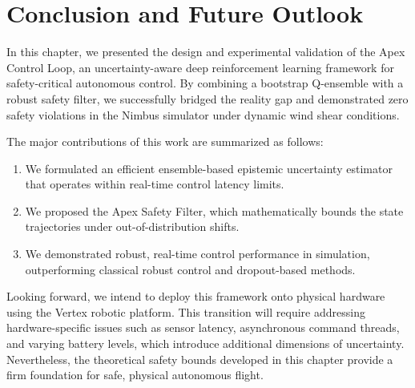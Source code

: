 \section{Conclusion and Future Outlook}

In this chapter, we presented the design and experimental validation of the Apex Control Loop, an uncertainty-aware deep reinforcement learning framework for safety-critical autonomous control. By combining a bootstrap Q-ensemble with a robust safety filter, we successfully bridged the reality gap and demonstrated zero safety violations in the Nimbus simulator under dynamic wind shear conditions.

The major contributions of this work are summarized as follows:
\begin{enumerate}
    \item We formulated an efficient ensemble-based epistemic uncertainty estimator that operates within real-time control latency limits.
    \item We proposed the Apex Safety Filter, which mathematically bounds the state trajectories under out-of-distribution shifts.
    \item We demonstrated robust, real-time control performance in simulation, outperforming classical robust control and dropout-based methods.
\end{enumerate}

Looking forward, we intend to deploy this framework onto physical hardware using the Vertex robotic platform. This transition will require addressing hardware-specific issues such as sensor latency, asynchronous command threads, and varying battery levels, which introduce additional dimensions of uncertainty. Nevertheless, the theoretical safety bounds developed in this chapter provide a firm foundation for safe, physical autonomous flight.

